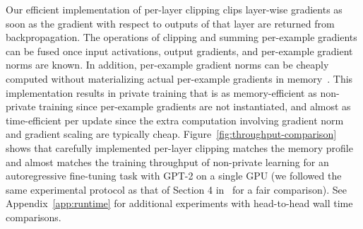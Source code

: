 Our efficient implementation of per-layer clipping clips layer-wise gradients as soon as the gradient with respect to outputs of that layer are returned from backpropagation.
The operations of clipping and summing per-example gradients can be fused once input activations, output gradients, and per-example gradient norms are known. In addition, per-example gradient norms can be cheaply computed without materializing actual per-example gradients in memory~\citep[Section 4]{li2022large}.
This implementation results in private training that is as memory-efficient as non-private training since per-example gradients are not instantiated, and almost as time-efficient per update since the extra computation involving gradient norm and gradient scaling are typically cheap.
Figure~\ref{fig:throughput-comparison} shows that carefully implemented per-layer clipping matches the memory profile and almost matches the training throughput of non-private learning for an autoregressive fine-tuning task with GPT-2 on a single GPU (we followed the same experimental protocol as that of Section 4 in~\citep{li2022large} for a fair comparison).
See Appendix~\ref{app:runtime} for additional experiments with head-to-head wall time comparisons. 


